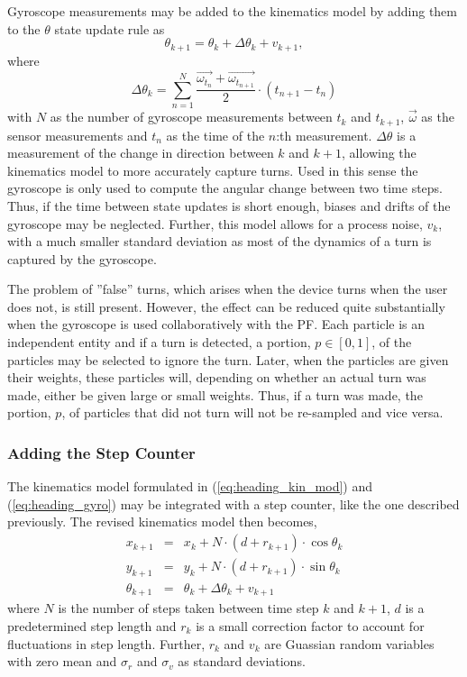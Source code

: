 \documentclass{LTHthesis}
\begin{document}
Gyroscope measurements may be added to the kinematics model by adding them to the $\theta$ state update rule as
%
\begin{equation}
\theta_{k+1} = \theta_k + \Delta\theta_k + v_{k+1}\label{eq:heading_gyro},
\end{equation} 
%
where
%
\begin{equation}
\Delta\theta_k = \sum^N_{n=1}\frac{\vec{\omega_{t_n}}+\vec{\omega_{t_{n+1}}}}{2}\cdot\left(t_{n+1}-t_n\right)
\end{equation}
%
with $N$ as the number of gyroscope measurements between $t_k$ and $t_{k+1}$, $\vec{\omega}$ as the sensor measurements and $t_n$ as the time of the $n$:th measurement. $\Delta\theta$ is a measurement of the change in direction between $k$ and $k+1$, allowing the kinematics model to more accurately capture turns. Used in this sense the gyroscope is only used to compute the angular change between two time steps. Thus, if the time between state updates is short enough, biases and drifts of the gyroscope may be neglected. Further, this model allows for a process noise, $v_k$, with a much smaller standard deviation as most of the dynamics of a turn is captured by the gyroscope. 

The problem of ''false'' turns, which arises when the device turns when the user does not, is still present. However, the effect can be reduced quite substantially when the gyroscope is used collaboratively with the PF. Each particle is an independent entity and if a turn is detected, a portion, $p\in[0,1]$, of the particles may be selected to ignore the turn. Later, when the particles are given their weights, these particles will, depending on whether an actual turn was made, either be given large or small weights. Thus, if a turn was made, the portion, $p$, of particles that did not turn will not be re-sampled and vice versa. 

\subsubsection{Adding the Step Counter}
%
The kinematics model formulated in (\ref{eq:heading_kin_mod}) and (\ref{eq:heading_gyro}) may be integrated with a step counter, like the one described previously. The revised kinematics model then becomes,
%
\begin{eqnarray}
x_{k+1} &  = & x_k + N\cdot (d + r_{k+1})\cdot\cos{\theta_k} \nonumber\\
y_{k+1} & = &y_k + N\cdot (d + r_{k+1})\cdot\sin{\theta_k}\label{eq:heading_step_kin_mod}\\
\theta_{k+1} & = & \theta_k +\Delta\theta_k+ v_{k+1} \nonumber
\end{eqnarray}  
%
where $N$ is the number of steps taken between time step $k$ and $k+1$, $d$ is a predetermined step length and $ r_k$ is a small correction factor to account for fluctuations in step length. Further, $r_k$ and $v_k$ are Guassian random variables with zero mean and $\sigma_r$ and  $\sigma_v$ as standard deviations.
\end{document}
